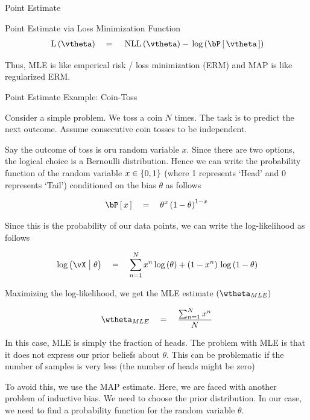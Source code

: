 \documentclass{article}
\begin{document}
\begin{ssection}{Point Estimate}
\begin{ssubsection}{Point Estimate via Loss Minimization Function}
		\begin{align*}
			\tfunc{L}{\vtheta}	\eq	\tfunc{NLL}{\vtheta} - \log{\prob{\vtheta}}
		\end{align*}

		 \br

		Thus, MLE is like emperical risk / loss minimization (ERM) and MAP is like regularized ERM.

	\end{ssubsection}

	\begin{ssubsection}{Point Estimate Example: Coin-Toss}

		Consider a simple problem. We toss a coin $N$ times. The task is to predict the next outcome. Assume consecutive coin tosses to be independent. \br

		Say the outcome of toss is oru random variable $x$. Since there are two options, the logical choice is a Bernoulli distribution. Hence we can write the probability function of the random variable $x \in \left\{ {0, 1} \right\}$ (where 1 represents `Head' and 0 represents `Tail') conditioned on the bias $\theta$ as follows

		\begin{align*}
			\prob{x}	\eq	\theta^{x} \para{1 - \theta}^{1 - x}
		\end{align*}

		Since this is the probability of our data points, we can write the log-likelihood as follows

		\begin{align*}
			\log{\vX \pipe \theta}	\eq	\sum_{n = 1}^N x^n \log{\theta} + \para{1 - x^n} \log{1 - \theta}
		\end{align*}

		Maximizing the log-likelihood, we get the MLE estimate $\para{\wtheta_{MLE}}$

		\begin{align*}
			\wtheta_{MLE}	\eq	\frac{\sum_{n = 1}^N x^n}{N}
		\end{align*}

		In this case, MLE is simply the fraction of heads. The problem with MLE is that it does not express our prior beliefs about $\theta$. This can be problematic if the number of samples is very less (the number of heads might be zero) \br

		To avoid this, we use the MAP estimate. Here, we are faced with another problem of inductive bias. We need to choose the prior distribution. In our case, we need to find a probability function for the random variable $\theta$. \br


\end{ssubsection}
\end{ssection}
\end{document}
